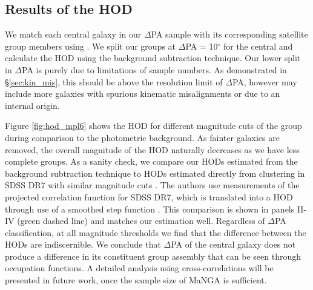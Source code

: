 \subsection{Results of the HOD}
We match each central galaxy in our $\Delta$PA sample with its corresponding satellite group members using \citet{yang2007}. We split our groups at $\Delta$PA = 10$^{\circ}$ for the central and calculate the HOD using the background subtraction technique. Our lower split in $\Delta$PA is purely due to limitations of sample numbers. As demonstrated in \S \ref{sec:kin_mis}, this should be above the resolution limit of $\Delta$PA, however may include more galaxies with spurious kinematic misalignments or due to an internal origin. 

Figure \ref{fig:hod_mpl6} shows the HOD for different magnitude cuts of the group during comparison to the photometric background. As fainter galaxies are removed, the overall magnitude of the HOD naturally decreases as we have less complete groups. As a sanity check, we compare our HODs estimated from the background subtraction technique to HODs estimated directly from clustering in SDSS DR7 with similar magnitude cuts \citep{zehavi2011}. The authors use measurements of the projected correlation function for SDSS DR7, which is translated into a HOD through use of a smoothed step function \citep[see equation 7;][]{zehavi2011}. This comparison is shown in panels II-IV (green dashed line) and matches our estimation well.
Regardless of $\Delta$PA classification, at all magnitude thresholds we find that the difference between the HODs are indiscernible. We conclude that $\Delta$PA of the central galaxy does not produce a difference in its constituent group assembly that can be seen through occupation functions. A detailed analysis using cross-correlations will be presented in future work, once the sample size of MaNGA is sufficient. 


